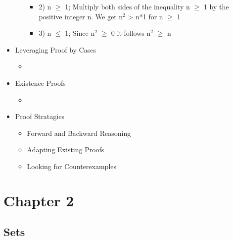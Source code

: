\documentclass[11pt]{article}
\begin{document}
\begin{itemize}
\begin{itemize}
\begin{itemize}
\item 2) n $\ge$ 1; Multiply both sides of the inequality n $\ge$ 1 by the positive integer n. We get n$^2$ > n*1 for n $\ge$ 1
\label{sec-1-8-1-4-2-4}%

\item 3) n $\le$ 1; Since n$^2$ $\ge$ 0 it follows n$^2$ $\ge$ n
\label{sec-1-8-1-4-2-5}%
\end{itemize} %
\end{itemize} %

\item Leveraging Proof by Cases
\label{sec-1-8-1-5}%
\begin{itemize}

\item 
%
\end{itemize} %

\item Existence Proofs
\label{sec-1-8-1-6}%
\begin{itemize}

\item 
%
\end{itemize} %

\item Proof Stratagies
\label{sec-1-8-1-7}%
\begin{itemize}

\item Forward and Backward Reasoning
\label{sec-1-8-1-7-1}%

\item Adapting Existing Proofs
\label{sec-1-8-1-7-2}%

\item Looking for Counterexamples
\label{sec-1-8-1-7-3}%
\end{itemize} %
\end{itemize} %
\section{Chapter 2}
\label{sec-2}
\subsection{Sets}
\label{sec-2-1}
\end{document}
